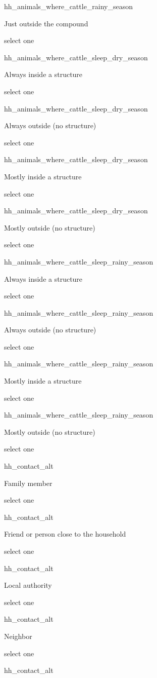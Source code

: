 \documentclass[]{article}
\begin{document}
hh\_animals\_where\_cattle\_rainy\_season

Just outside the compound

select one

hh\_animals\_where\_cattle\_sleep\_dry\_season

Always inside a structure

select one

hh\_animals\_where\_cattle\_sleep\_dry\_season

Always outside (no structure)

select one

hh\_animals\_where\_cattle\_sleep\_dry\_season

Mostly inside a structure

select one

hh\_animals\_where\_cattle\_sleep\_dry\_season

Mostly outside (no structure)

select one

hh\_animals\_where\_cattle\_sleep\_rainy\_season

Always inside a structure

select one

hh\_animals\_where\_cattle\_sleep\_rainy\_season

Always outside (no structure)

select one

hh\_animals\_where\_cattle\_sleep\_rainy\_season

Mostly inside a structure

select one

hh\_animals\_where\_cattle\_sleep\_rainy\_season

Mostly outside (no structure)

select one

hh\_contact\_alt

Family member

select one

hh\_contact\_alt

Friend or person close to the household

select one

hh\_contact\_alt

Local authority

select one

hh\_contact\_alt

Neighbor

select one

hh\_contact\_alt
\end{document}
